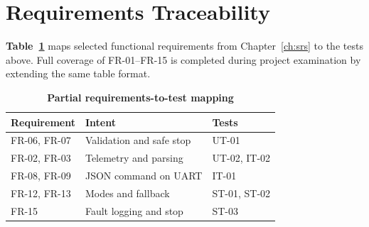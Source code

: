 \section{Requirements Traceability}
\label{sec:traceability}

\textbf{Table~\ref{tab:trace}} maps selected functional requirements from Chapter~\ref{ch:srs} to the tests above. Full coverage of FR-01--FR-15 is completed during project examination by extending the same table format.

\begin{table}[H]
\centering
\caption[Partial requirements-to-test mapping]{\textbf{Partial requirements-to-test mapping}}
\label{tab:trace}
\begin{tabularx}{\textwidth}{|>{\raggedright\arraybackslash}p{2.4cm}|X|>{\raggedright\arraybackslash}p{2.8cm}|}
\hline
\textbf{Requirement} & \textbf{Intent} & \textbf{Tests} \\
\hline
FR-06, FR-07 & Validation and safe stop & UT-01 \\
\hline
FR-02, FR-03 & Telemetry and parsing & UT-02, IT-02 \\
\hline
FR-08, FR-09 & JSON command on UART & IT-01 \\
\hline
FR-12, FR-13 & Modes and fallback & ST-01, ST-02 \\
\hline
FR-15 & Fault logging and stop & ST-03 \\
\hline
\end{tabularx}
\end{table}


